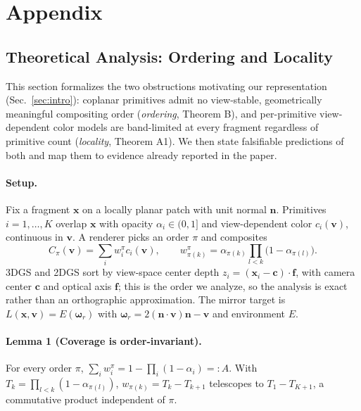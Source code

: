 \section{Appendix}

\subsection{Theoretical Analysis: Ordering and Locality}
\label{app:theory}
This section formalizes the two obstructions motivating our representation (Sec.~\ref{sec:intro}):
coplanar primitives admit no view-stable, geometrically meaningful compositing order
(\emph{ordering}, Theorem B), and per-primitive view-dependent color models are band-limited at
every fragment regardless of primitive count (\emph{locality}, Theorem A1). We then state
falsifiable predictions of both and map them to evidence already reported in the paper.

\paragraph{Setup.} Fix a fragment $\mathbf{x}$ on a locally planar patch with unit normal
$\mathbf{n}$. Primitives $i=1,\dots,K$ overlap $\mathbf{x}$ with opacity $\alpha_i\in(0,1]$ and
view-dependent color $c_i(\mathbf{v})$, continuous in $\mathbf{v}$. A renderer picks an order $\pi$
and composites
\begin{equation}
C_\pi(\mathbf{v}) = \sum_i w_i^\pi c_i(\mathbf{v}), \qquad
w^\pi_{\pi(k)} = \alpha_{\pi(k)}\prod_{l<k}\big(1-\alpha_{\pi(l)}\big).
\label{eq:theory-composite}
\end{equation}
3DGS and 2DGS sort by view-space center depth $z_i = (\mathbf{x}_i - \mathbf{c})\cdot \mathbf{f}$,
with camera center $\mathbf{c}$ and optical axis $\mathbf{f}$; this is the order we analyze, so the
analysis is exact rather than an orthographic approximation. The mirror target is
$L(\mathbf{x},\mathbf{v}) = E(\boldsymbol{\omega}_r)$ with
$\boldsymbol{\omega}_r = 2(\mathbf{n}\cdot\mathbf{v})\mathbf{n}-\mathbf{v}$ and environment $E$.

\paragraph{Lemma 1 (Coverage is order-invariant).} For every order $\pi$,
$\sum_i w_i^\pi = 1-\prod_i(1-\alpha_i) =: A$. With $T_k=\prod_{l<k}(1-\alpha_{\pi(l)})$,
$w_{\pi(k)}=T_k-T_{k+1}$ telescopes to $T_1-T_{K+1}$, a commutative product independent of $\pi$.

